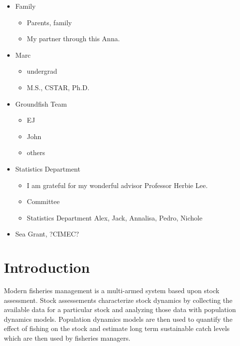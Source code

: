 \documentclass[12pt]{ucscthesis}
\begin{document}
\begin{frontmatter}
\begin{acknowledgements}
\begin{itemize}
\item Family
\begin{itemize}
\item Parents, family
\item My partner through this Anna.
\end{itemize}
\item Marc
\begin{itemize}
	\item undergrad
	\item M.S., CSTAR, Ph.D. 
\end{itemize}
\item Groundfish Team
\begin{itemize}
\item EJ
\item John
\item others
\end{itemize}
\item Statistics Department
\begin{itemize}
\item I am grateful for my wonderful advisor Professor Herbie Lee.
\item Committee 
\item Statistics Department Alex, Jack, Annalisa, Pedro, Nichole
\end{itemize}
\item Sea Grant, ?CIMEC?
\end{itemize}
\end{acknowledgements}

\end{frontmatter}


%
\linenumbers

%
\chapter{Introduction \label{intro}}
\clearpage

%
Modern fisheries management is a multi-armed system based upon stock assessment. 
Stock assessements characterize stock dynamics by collecting the available 
data for a particular stock and analyzing those data with population dynamics 
models. Population dynamics models are then used to quantify the effect of 
fishing on the stock and estimate long term sustainable catch levels which are 
then used by fisheries managers. 
\end{document}
